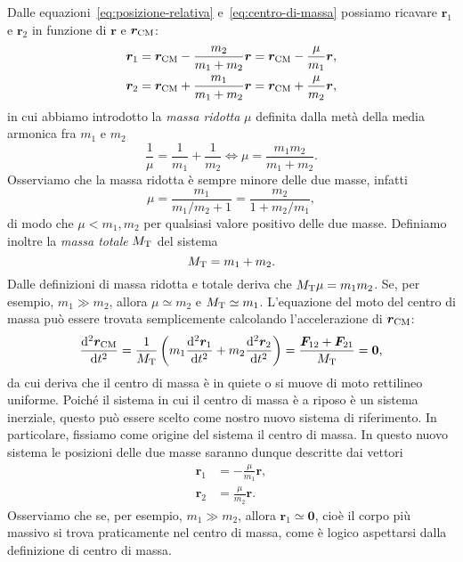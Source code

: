 Dalle equazioni~\eqref{eq:posizione-relativa} e~\eqref{eq:centro-di-massa}
possiamo ricavare $\bm{r}_1$ e $\bm{r}_2$ in funzione di $\bm{r}$ e
$\bm{r}_\textup{CM}$:
\begin{subequations}
  \label{eq:r1-r2-posizione-relativa-cdm}
  \begin{align}
    \bm{r}_1 &= \bm{r}_\textup{CM} - \frac{m_2}{m_1+m_2}\bm{r} =
    \bm{r}_\textup{CM} - \frac{\mu}{m_1}\bm{r},\\
    \bm{r}_2 &= \bm{r}_\textup{CM} + \frac{m_1}{m_1+m_2}\bm{r} =
    \bm{r}_\textup{CM} + \frac{\mu}{m_2}\bm{r},
  \end{align}
\end{subequations}
in cui abbiamo introdotto la \emph{massa ridotta} $\mu$ definita dalla metà
della media armonica fra $m_1$ e $m_2$
\begin{equation}
  \frac{1}{\mu} = \frac{1}{m_1} + \frac{1}{m_2} \iff \mu=\frac{m_1m_2}{m_1+m_2}.
\end{equation}
Osserviamo che la massa ridotta è sempre minore delle due masse, infatti
\begin{equation}
  \mu =\frac{m_1}{m_1/m_2+1} = \frac{m_2}{1+m_2/m_1},
\end{equation}
di modo che $\mu < m_1,m_2$ per qualsiasi valore positivo delle due masse.
Definiamo inoltre la \emph{massa totale} $M_\textup{T}$ del sistema
\begin{equation}
  M_\textup{T}=m_1+m_2.
\end{equation}
Dalle definizioni di massa ridotta e totale deriva che
$M_\textup{T}\mu=m_1m_2$. Se, per esempio, $m_1\gg m_2$, allora $\mu\simeq m_2$ e
$M_\textup{T}\simeq m_1$. L'equazione del moto del centro di massa può essere
trovata semplicemente calcolando l'accelerazione di $\bm{r}_\textup{CM}$:
\begin{equation}
  \toder[2]{\bm{r}_\textup{CM}}{t} = \frac{1}{M_\textup{T}}
  \left(
    m_1\toder[2]{\bm{r}_1}{t} + m_2\toder[2]{\bm{r}_2}{t}
  \right) = \frac{\bm{F}_{12}+\bm{F}_{21}}{M_\textup{T}} = \bm{0},
\end{equation}
da cui deriva che il centro di massa è in quiete o si muove di moto rettilineo
uniforme. Poiché il sistema in cui il centro di massa è a riposo è un sistema
inerziale, questo può essere scelto come nostro nuovo sistema di riferimento.
In particolare, fissiamo come origine del sistema il centro di massa. In questo
nuovo sistema le posizioni delle due masse saranno dunque descritte dai vettori
\begin{subequations}
  \label{eq:r1-r2-nel-cdm}
  \begin{align}
    \bm{r}_1 &= -\frac{\mu}{m_1}\bm{r},\\
    \bm{r}_2 &= \frac{\mu}{m_2}\bm{r}.
  \end{align}
\end{subequations}
Osserviamo che se, per esempio, $m_1\gg m_2$, allora $\bm{r}_1\simeq\bm{0}$,
cioè il corpo più massivo si trova praticamente nel centro di massa, come è
logico aspettarsi dalla definizione di centro di massa.

